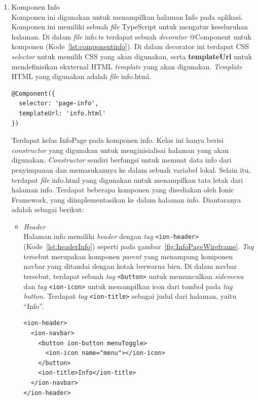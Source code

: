 \begin{enumerate}
	\item Komponen Info \\
	Komponen ini digunakan untuk menampilkan halaman Info pada aplikasi. Komponen ini memiliki sebuah \textit{file} TypeScript untuk mengatur keseluruhan halaman. Di dalam \textit{file} info.ts terdapat sebuah \textit{decorator} @Component untuk komponen (Kode~\ref{lst:componentinfo}). Di dalam decorator ini terdapat CSS \textit{selector} untuk memilih CSS yang akan digunakan, serta \textbf{templateUrl} untuk mendefinisikan ekxternal HTML \textit{template} yang akan digunakan. \textit{Template} HTML yang digunakan adalah \textit{file} info.html. 
	
\begin{lstlisting}[label={lst:componentinfo}, caption=@Component pada info.ts]
@Component({
  selector: 'page-info',
  templateUrl: 'info.html'
})
\end{lstlisting} 

	Terdapat kelas InfoPage pada komponen info. Kelas ini hanya berisi \textit{constructor} yang digunakan untuk menginisialisai halaman yang akan digunakan. \textit{Constructor} sendiri berfungsi untuk memuat data info dari penyimpanan dan memasukannya ke dalam sebuah variabel lokal.
	Selain itu, terdapat \textit{file} info.html yang digunakan untuk menampilkan tata letak dari halaman info. Terdapat beberapa komponen yang disediakan oleh Ionic Framework, yang diimplementasikan ke dalam halaman info. Diantaranya adalah sebagai berikut:
	
	\begin{itemize}
		\item \textit{Header} \\
		Halaman info memiliki \textit{header} dengan \textit{tag} \texttt{<ion-header>} (Kode~\ref{lst:headerInfo}) seperti pada gambar~\ref{fig:InfoPageWireframe}. \textit{Tag} tersebut merupakan komponen \textit{parent} yang menampung komponen navbar yang ditandai dengan kotak berwarna biru. Di dalam navbar tersebut, terdapat sebuah \textit{tag} \texttt{<button>} untuk memunculkan \textit{sidemenu} dan \textit{tag} \texttt{<ion-icon>} untuk menampilkan icon dari tombol pada \textit{tag button}. Terdapat \textit{tag} \texttt{<ion-title>} sebagai judul dari halaman, yaitu ``Info''.
	
\begin{lstlisting}[label={lst:headerInfo}, caption=\textit{Header} pada info.html]
<ion-header>
  <ion-navbar>
    <button ion-button menuToggle>
      <ion-icon name="menu"></ion-icon>
    </button>
    <ion-title>Info</ion-title>
  </ion-navbar>
</ion-header>
\end{lstlisting} 


\end{itemize}
\end{enumerate}
